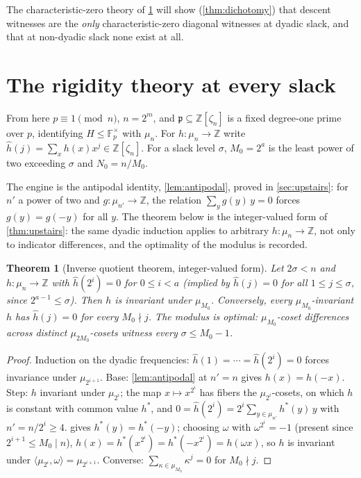 \documentclass[11pt]{article}
\newtheorem{theorem}{Theorem}[section]
\theoremstyle{definition}
\newcommand{\F}{\mathbb F}
\newcommand{\Z}{\mathbb Z}
\newcommand{\mufn}{\mu_n}
\begin{document}
The characteristic-zero theory of \cref{sec:rigidity} will show (\cref{thm:dichotomy}) that descent witnesses are the \emph{only} characteristic-zero diagonal witnesses at dyadic slack, and that at non-dyadic slack none exist at all.

\section{The rigidity theory at every slack}\label{sec:rigidity}

From here $p\equiv1\pmod n$, $n=2^m$, and $\mathfrak p\subseteq\Z[\zeta_n]$ is a fixed degree-one prime over $p$, identifying $H\le\F_p^\times$ with $\mufn$.  For $h:\mufn\to\Z$ write $\widehat h(j)=\sum_xh(x)x^j\in\Z[\zeta_n]$.  For a slack level $\sigma$, $M_0=2^a$ is the least power of two exceeding $\sigma$ and $N_0=n/M_0$.

The engine is the antipodal identity, \cref{lem:antipodal}, proved in \cref{sec:upstairs}: for $n'$ a power of two and $g:\mu_{n'}\to\Z$, the relation $\sum_yg(y)\,y=0$ forces $g(y)=g(-y)$ for all $y$.  The theorem below is the integer-valued form of \cref{thm:upstairs}: the same dyadic induction applies to arbitrary $h:\mufn\to\Z$, not only to indicator differences, and the optimality of the modulus is recorded.

\begin{theorem}[Inverse quotient theorem, integer-valued form]\label{thm:rigidity}
Let $2\sigma<n$ and $h:\mufn\to\Z$ with $\widehat h(2^i)=0$ for $0\le i<a$ (implied by $\widehat h(j)=0$ for all $1\le j\le\sigma$, since $2^{a-1}\le\sigma$).  Then $h$ is invariant under $\mu_{M_0}$.  Conversely, every $\mu_{M_0}$-invariant $h$ has $\widehat h(j)=0$ for every $M_0\nmid j$.  The modulus is optimal: $\mu_{M_0}$-coset differences across distinct $\mu_{2M_0}$-cosets witness every $\sigma\le M_0-1$.
\end{theorem}

\begin{proof}
Induction on the dyadic frequencies: $\widehat h(1)=\cdots=\widehat h(2^i)=0$ forces invariance under $\mu_{2^{i+1}}$.  Base: \cref{lem:antipodal} at $n'=n$ gives $h(x)=h(-x)$.  Step: $h$ invariant under $\mu_{2^i}$; the map $x\mapsto x^{2^i}$ has fibers the $\mu_{2^i}$-cosets, on which $h$ is constant with common value $h^*$, and
$0=\widehat h(2^i)=2^i\sum_{y\in\mu_{n'}}h^*(y)\,y$ with $n'=n/2^i\ge4$.   gives $h^*(y)=h^*(-y)$; choosing $\omega$ with $\omega^{2^i}=-1$ (present since $2^{i+1}\le M_0\mid n$), $h(x)=h^*(x^{2^i})=h^*(-x^{2^i})=h(\omega x)$, so $h$ is invariant under $\langle\mu_{2^i},\omega\rangle=\mu_{2^{i+1}}$.  Converse: $\sum_{\kappa\in\mu_{M_0}}\kappa^j=0$ for $M_0\nmid j$.
\end{proof}
\end{document}
